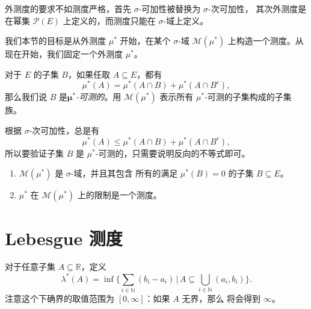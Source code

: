 \documentclass[fontset=none]{Notes}
\begin{document}
外测度的要求不如测度严格，首先 $\sigma$-可加性被替换为 $\sigma$-次可加性，
其次外测度是在幂集 $\mathcal{P}(E)$ 上定义的，而测度只能在
$\sigma$-域上定义。

我们本节的目标是从外测度 $\mu^*$ 开始，在某个 $\sigma$-域 $\mathcal{M}(\mu^*)$
上构造一个测度。从现在开始，我们固定一个外测度 $\mu^*$。

\begin{definition}
  对于 $E$ 的子集 $B$，如果任取 $A\subseteq E$，都有
  \[
    \mu^*(A)=\mu^*(A\cap B)+\mu^*(A\cap B^c),  
  \]
  那么我们说 $B$ 是\emph{$\mathbold{\mu^*}$-可测的}。用
  $\mathcal{M}(\mu^*)$ 表示所有 $\mu^*$-可测的子集构成的子集族。
\end{definition}

\begin{remark}
  根据 $\sigma$-次可加性，总是有
  \[
    \mu^*(A)\leq \mu^*(A\cap B)+\mu^*(A\cap B^c),
  \]
  所以要验证子集 $B$ 是 $\mu^*$-可测的，只需要说明反向的不等式即可。
\end{remark}

\begin{theorem}\label{thm:outer measure}
  \mbox{}
  \begin{enumerate}
    \item $\mathcal{M}(\mu^*)$ 是 $\sigma$-域，并且其包含
    所有的满足 $\mu^*(B)=0$ 的子集 $B\subseteq E$。
    \item $\mu^*$ 在 $\mathcal{M}(\mu^*)$ 上的限制是一个测度。
  \end{enumerate}
\end{theorem}


\section{Lebesgue 测度}

对于任意子集 $A\subseteq \mathbb{R}$，定义
\[
  \lambda^*(A)=\inf\bigg\{\sum_{i\in \mathbb{N}}(b_i-a_i)\,|\, A\subseteq \bigcup_{i\in \mathbb{N}}(a_i,b_i)\bigg\}  .
\]
注意这个下确界的取值范围为 $[0,\infty]$：如果 $A$ 无界，那么
将会得到 $\infty$。
\end{document}
